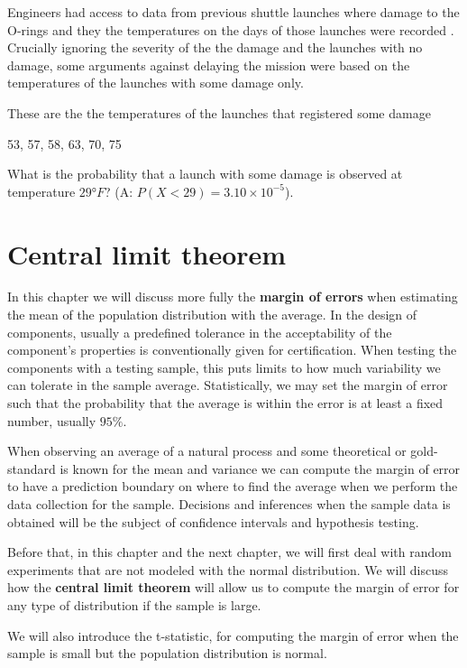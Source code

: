 \documentclass[
]{book}
\begin{document}
Engineers had access to data from previous shuttle launches where damage to the O-rings and they the temperatures on the days of those launches were recorded \citep{tufte1997visual}. Crucially ignoring the severity of the the damage and the launches with no damage, some arguments against delaying the mission were based on the temperatures of the launches with some damage only.

These are the the temperatures of the launches that registered some damage

53, 57, 58, 63, 70, 75

What is the probability that a launch with some damage is observed at temperature \(29°F\)? (A: \(P(X< 29)=3.10\times 10^{-5}\)).

\hypertarget{central-limit-theorem}{%
\chapter{Central limit theorem}\label{central-limit-theorem}}

In this chapter we will discuss more fully the \textbf{margin of errors} when estimating the mean of the population distribution with the average. In the design of components, usually a predefined tolerance in the acceptability of the component's properties is conventionally given for certification. When testing the components with a testing sample, this puts limits to how much variability we can tolerate in the sample average. Statistically, we may set the margin of error such that the probability that the average is within the error is at least a fixed number, usually \(95\%\).

When observing an average of a natural process and some theoretical or gold-standard is known for the mean and variance we can compute the margin of error to have a prediction boundary on where to find the average when we perform the data collection for the sample. Decisions and inferences when the sample data is obtained will be the subject of confidence intervals and hypothesis testing.

Before that, in this chapter and the next chapter, we will first deal with random experiments that are not modeled with the normal distribution. We will discuss how the \textbf{central limit theorem} will allow us to compute the margin of error for any type of distribution if the sample is large.

We will also introduce the t-statistic, for computing the margin of error when the sample is small but the population distribution is normal.
\end{document}
